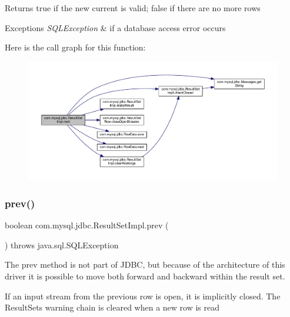 \begin{DoxyReturn}{Returns}
true if the new current is valid; false if there are no more rows
\end{DoxyReturn}

\begin{DoxyExceptions}{Exceptions}
{\em S\+Q\+L\+Exception} & if a database access error occurs \\
\hline
\end{DoxyExceptions}
Here is the call graph for this function\+:
\nopagebreak
\begin{figure}[H]
\begin{center}
\leavevmode
\includegraphics[width=350pt]{classcom_1_1mysql_1_1jdbc_1_1_result_set_impl_af9c00327ccf944cdcca7b610b69c5f26_cgraph}
\end{center}
\end{figure}
\mbox{\label{classcom_1_1mysql_1_1jdbc_1_1_result_set_impl_a6d8981c984b457ad7b9b38aa42db4a37}} 
\subsubsection{\texorpdfstring{prev()}{prev()}}
{\footnotesize\ttfamily boolean com.\+mysql.\+jdbc.\+Result\+Set\+Impl.\+prev (\begin{DoxyParamCaption}{ }\end{DoxyParamCaption}) throws java.\+sql.\+S\+Q\+L\+Exception}

The prev method is not part of J\+D\+BC, but because of the architecture of this driver it is possible to move both forward and backward within the result set.

If an input stream from the previous row is open, it is implicitly closed. The Result\+Set\textquotesingle{}s warning chain is cleared when a new row is read 

